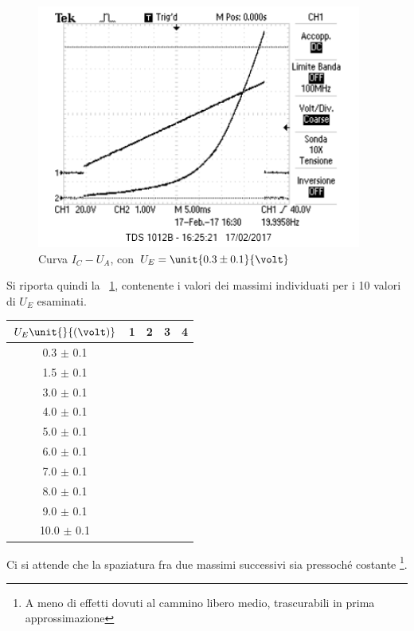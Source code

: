 \documentclass[10pt,a4paper]{article}
\begin{document}
\begin{figure}[H]
\begin{minipage}{0.55\textwidth}
		\includegraphics[width=0.95\textwidth]{../oscilloscopio/Task9_0.png}
		\caption{Curva $I_{C} - U_{A}$, con $U_E = \unit{0.3 \pm 0.1}{\volt}$}
		\label{fig:UEex3}
	\end{minipage}
\end{figure}

Si riporta quindi la \tablename{~\ref{tab:maxfit}}, contenente i valori dei massimi individuati per i 10 valori di $U_E$ esaminati.

\begin{table}[h!]
	\centering
	\begin{tabular}{c|c|c|c|c}
		\hline
		$U_E \unit{}{(\volt)}$ & 1 & 2 & 3 & 4\\
		\hline 
		0.3 $\pm$ 0.1 & & & & \\
		1.5 $\pm$ 0.1 & & & & \\
		3.0 $\pm$ 0.1 & & & & \\
		4.0 $\pm$ 0.1 & & & & \\
		5.0 $\pm$ 0.1 & & & & \\
		6.0 $\pm$ 0.1 & & & & \\
		7.0 $\pm$ 0.1 & & & & \\
		8.0 $\pm$ 0.1 & & & & \\
		9.0 $\pm$ 0.1 & & & & \\
		10.0 $\pm$ 0.1 & & & & \\
		\hline
	\end{tabular}
	\label{tab:maxfit}
\end{table}

Ci si attende che la spaziatura fra due massimi successivi sia pressoché costante \footnote{A meno di effetti dovuti al cammino libero medio, trascurabili in prima approssimazione}.
\end{document}
